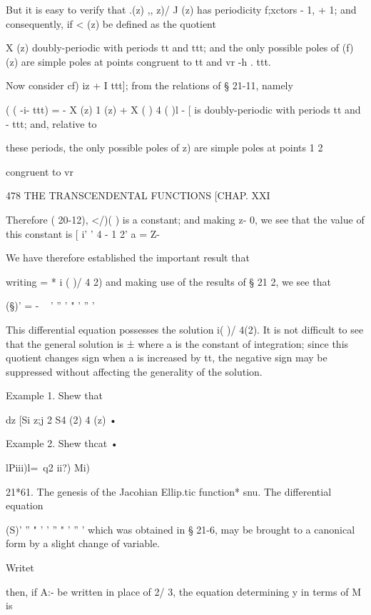But it is easy to verify that .(z) ,, z)/ J (z) has periodicity
f;xctors - 1, + 1; and consequently, if < (z) be defined as the
quotient

 X (z) %
doubly-periodic with periods tt and ttt; and the only possible poles
of (f) (z) are simple poles at points congruent to tt and vr -h . ttt.

Now consider cf) iz + I ttt]; from the relations of § 21-11, namely



( ( -i- ttt) = - X (z) 1 (z) + X ( ) 4 ( )l - [%
is doubly-periodic with periods tt and - ttt; and, relative to

these periods, the only possible poles of z) are simple poles at
points 1 2

congruent to vr

478 THE TRANSCENDENTAL FUNCTIONS [CHAP. XXI

Therefore ( 20-12), </)( ) is a constant; and making z- 0, we see that
the value of this constant is [ i' ' 4 - 1 2' a = Z-

We have therefore established the important result that

writing = * i ( )/ 4 2) and making use of the results of § 21 2, we
see that

(§)' = - ~ ' '' ' " ' '' '

This differential equation possesses the solution i( )/ 4(2). It is
not difficult to see that the general solution is ±%
where a is the constant of integration; since this quotient changes
sign when a is increased by tt, the negative sign may be suppressed
without affecting the generality of the solution.

Example 1. Shew that

dz [Si z;j 2 S4 (2) 4 (z) •

Example 2. Shew thcat •

lPiii)l=\ q2 ii?) Mi)

21*61. The genesis of the Jacohian Ellip.tic function* snu. The
differential equation

(S)' '' " ' ' '' " ' '' ' which was obtained in § 21-6, may be brought
to a canonical form by a slight change of variable.

Writet %

then, if A:- be written in place of 2/ 3, the equation determining y
in terms of M is

